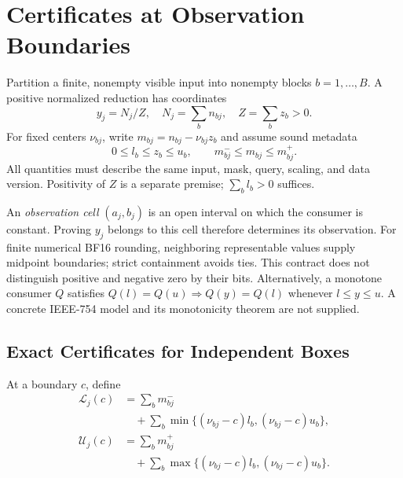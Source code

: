 \section{Certificates at Observation Boundaries}
\label{sec:certificates}

Partition a finite, nonempty visible input into nonempty blocks
$b=1,\ldots,B$. A positive normalized reduction has coordinates
\begin{equation}
 y_j=N_j/Z,\quad N_j=\sum_b n_{bj},\quad Z=\sum_b z_b>0.
 \label{eq:normalized-reduction}
\end{equation}
For fixed centers $\nu_{bj}$, write $m_{bj}=n_{bj}-\nu_{bj}z_b$ and assume
sound metadata
\begin{equation}
 0\le l_b\le z_b\le u_b,\qquad
 m^-_{bj}\le m_{bj}\le m^+_{bj}.
 \label{eq:block-boxes}
\end{equation}
All quantities must describe the same input, mask, query, scaling, and data
version. Positivity of $Z$ is a separate premise; $\sum_b l_b>0$ suffices.

An \emph{observation cell} $(a_j,b_j)$ is an open interval on which the consumer
is constant. Proving $y_j$ belongs to this cell therefore determines its
observation. For finite numerical BF16 rounding, neighboring representable
values supply midpoint boundaries; strict containment avoids ties. This
contract does not distinguish positive and negative zero by their bits.
Alternatively, a monotone consumer $Q$ satisfies $Q(l)=Q(u)\Rightarrow
Q(y)=Q(l)$ whenever $l\le y\le u$. A concrete IEEE-754 model and its
monotonicity theorem are not supplied.

\subsection{Exact Certificates for Independent Boxes}

At a boundary $c$, define
\begin{equation}
 \begin{split}
 \mathcal L_j(c)&=\sum_b m^-_{bj}\\
 &\quad+\sum_b\min\{(\nu_{bj}-c)l_b,(\nu_{bj}-c)u_b\},
 \end{split}
 \label{eq:lower-residual}
\end{equation}
\begin{equation}
 \begin{split}
 \mathcal U_j(c)&=\sum_b m^+_{bj}\\
 &\quad+\sum_b\max\{(\nu_{bj}-c)l_b,(\nu_{bj}-c)u_b\}.
 \end{split}
 \label{eq:upper-residual}
\end{equation}

